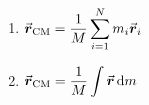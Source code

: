 

\vspace*{\fill}
\centering

\begin{enumerate}
    \item $\displaystyle \va*{r}_{\rm CM} = \frac{1}{M}\sum_{i=1}^{N} m_{i} \va*{r}_{i}$
    \item $\displaystyle \va*{r}_{\rm CM} = \frac{1}{M}\int \va*{r} \dd{m}$
\end{enumerate}

\centering
\vspace*{\fill}

